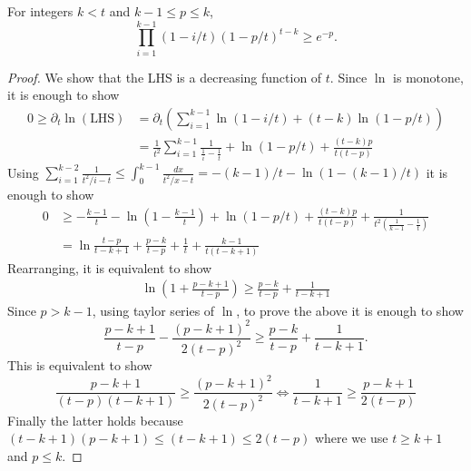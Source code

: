 \begin{fact}\label{fact:1-pm^m}
For  integers $k<t$ and $k-1\leq p\leq k$, 
$$\prod_{i=1}^{k-1} (1-i/t) (1-p/t)^{t-k}\geq e^{-p}.$$
\end{fact}
\begin{proof}
We show that the LHS is a decreasing function of $t$. Since $\ln$ is monotone, it is enough to show 
\begin{align*} 0\geq \partial_t  \ln (\text{LHS}) &= \partial_t \left(\sum_{i=1}^{k-1} \ln(1-i/t) + (t-k)\ln(1-p/t)\right)\\
	&= \frac{1}{t^2}\sum_{i=1}^{k-1} \frac{1}{\frac1{i} - \frac{1}{t}} + \ln(1-p/t) + \frac{(t-k)p}{t(t-p)} 
\end{align*}
Using $\sum_{i=1}^{k-2} \frac{1}{t^2/i-t}\leq \int_{0}^{k-1} \frac{dx}{t^2/x - t}=-(k-1)/t -\ln(1-(k-1)/t)$
it is enough to show
\begin{align*}
0&\geq 	-\frac{k-1}{t} - \ln (1-\frac{k-1}{t}) + \ln(1-p/t) + \frac{(t-k)p}{t(t-p)} + \frac{1}{t^2(\frac1{k-1} - \frac1t)}\\
&= \ln\frac{t-p}{t-k+1} + \frac{p-k}{t-p}+\frac{1}{t}+\frac{k-1}{t(t-k+1)}
\end{align*}
Rearranging, it is equivalent to show
\begin{align*}
\ln (1+\frac{p-k+1}{t-p})	\geq \frac{p-k}{t-p} + \frac{1}{t-k+1}
\end{align*}
Since $p>k-1$, using taylor series of $\ln$, to prove the above it is enough to show
$$ \frac{p-k+1}{t-p} - \frac{(p-k+1)^2}{2(t-p)^2} \geq \frac{p-k}{t-p} + \frac{1}{t-k+1}.$$
This is equivalent to show
$$ \frac{p-k+1}{(t-p)(t-k+1)} \geq \frac{(p-k+1)^2}{2(t-p)^2} \Leftrightarrow \frac{1}{t-k+1} \geq \frac{p-k+1}{2(t-p)} $$
Finally the latter holds because $(t-k+1)(p-k+1)\leq (t-k+1)\leq 2(t-p)$ where we use $t\geq k+1$ and $p\leq k$.
\end{proof}

